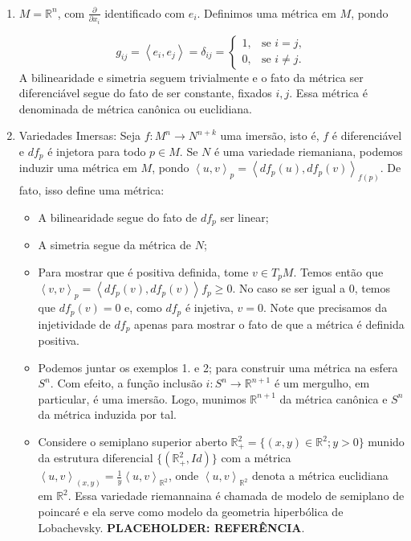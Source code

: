 \begin{examples}
    \label{loc:exemplos_de_métricas_e_isometrias.exemplos_simples}
    $ $
    \begin{enumerate}
        \item $M=\mathbb{R}^{n}$, com $\frac{\partial}{\partial x_{i}}$ identificado com $e_{i}$. Definimos uma métrica em  $M$, pondo

              \begin{equation*}
                  g_{ij}=\left< e_{i}, e_{j} \right>= \delta_{ij}= \begin{cases} 1, & \text{se } i=j,\\ 0, & \text{se } i\neq j. \end{cases}
              \end{equation*}
              A bilinearidade e simetria seguem trivialmente e o fato da métrica ser diferenciável segue do fato de ser constante, fixados $i,j$. Essa métrica é denominada de métrica canônica ou euclidiana.
        \item Variedades Imersas:
              Seja $f:M^{n}\to N^{n+k}$ uma imersão, isto é, $f$ é diferenciável e $df_{p}$ é injetora para todo $p \in M$.
              Se $N$ é uma variedade riemaniana, podemos induzir uma métrica em $M$, pondo $\left< u, v \right>_{p}=\left< df_{p}(u), df_{p}(v) \right>_{f(p)}$. De fato, isso define uma métrica:
              \begin{itemize}
                  \item A bilinearidade segue do fato de $df_{p}$ ser linear;
                  \item A simetria segue da métrica de $N$;
                  \item Para mostrar que é positiva definida, tome $v \in T_{p}M$. Temos então que $\left< v, v \right>_{p}=\left< df_{p}(v), df_{p}(v) \right>f_{p}\geq0$. No caso se ser igual a $0$, temos que $df_{p}(v)=0$ e, como $df_{p}$ é injetiva, $v=0$.
                        Note que precisamos da injetividade de $df_{p}$ apenas para mostrar o fato de que a métrica é definida positiva.
                  \item Podemos juntar os exemplos 1. e 2; para construir uma métrica na esfera $S^{n}$. Com efeito, a função inclusão $i:S^{n}\to \mathbb{R}^{n+1}$ é um mergulho, em particular, é uma imersão. Logo, munimos $\mathbb{R}^{n+1}$ da métrica canônica e $S^{n}$ da métrica induzida por tal.
                  \item Considere o semiplano superior aberto $\mathbb{R}^{2}_{+}=\{ (x,y) \in \mathbb{R}^{2}; y >0 \}$ munido da estrutura diferencial $\{ (\mathbb{R}^{2}_{+},Id) \}$ com a métrica $\left<u,v\right>_{(x,y)}= \frac{1}{y}\left<u,v\right>_{\mathbb{R}^{2}}$, onde $\left<u,v\right>_{\mathbb{R}^{2}}$ denota a métrica euclidiana em $\mathbb{R}^{2}$. Essa variedade riemannaina é chamada de modelo de semiplano de poincaré e ela serve como modelo da geometria hiperbólica de Lobachevsky.  \textbf{PLACEHOLDER: REFERÊNCIA}.

\end{itemize}
\end{enumerate}
\end{examples}
